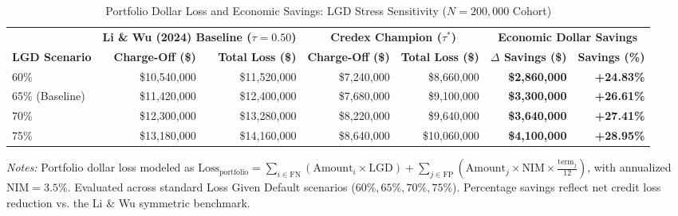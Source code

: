 \begin{table}[htbp]
\centering
\caption{Portfolio Dollar Loss and Economic Savings: LGD Stress Sensitivity ($N=200,000$ Cohort)}
\label{tab:economic_dollar_savings}
\small
\begin{tabular}{lrrrrrr}
\toprule
 & \multicolumn{2}{c}{\textbf{Li \& Wu (2024) Baseline ($\tau=0.50$)}} & \multicolumn{2}{c}{\textbf{Credex Champion ($\tau^*$)}} & \multicolumn{2}{c}{\textbf{Economic Dollar Savings}} \\
\cmidrule(lr){2-3} \cmidrule(lr){4-5} \cmidrule(lr){6-7}
\textbf{LGD Scenario} & \textbf{Charge-Off (\$)} & \textbf{Total Loss (\$)} & \textbf{Charge-Off (\$)} & \textbf{Total Loss (\$)} & \textbf{$\Delta$ Savings (\$)} & \textbf{Savings (\%)} \\
\midrule
    60\% & \$10,540,000 & \$11,520,000 & \$7,240,000 & \$8,660,000 & \textbf{\$2,860,000} & \textbf{+24.83\%} \\
    65\% (Baseline) & \$11,420,000 & \$12,400,000 & \$7,680,000 & \$9,100,000 & \textbf{\$3,300,000} & \textbf{+26.61\%} \\
    70\% & \$12,300,000 & \$13,280,000 & \$8,220,000 & \$9,640,000 & \textbf{\$3,640,000} & \textbf{+27.41\%} \\
    75\% & \$13,180,000 & \$14,160,000 & \$8,640,000 & \$10,060,000 & \textbf{\$4,100,000} & \textbf{+28.95\%} \\
\bottomrule
\end{tabular}
\begin{minipage}{\linewidth}\vspace{1ex}\footnotesize
\textit{Notes:} Portfolio dollar loss modeled as $\text{Loss}_{\text{portfolio}} = \sum_{i \in \text{FN}} (\text{Amount}_i \times \text{LGD}) + \sum_{j \in \text{FP}} (\text{Amount}_j \times \text{NIM} \times \frac{\text{term}_j}{12})$, with annualized $\text{NIM} = 3.5\%$. Evaluated across standard Loss Given Default scenarios ($60\%, 65\%, 70\%, 75\%$). Percentage savings reflect net credit loss reduction vs. the Li \& Wu symmetric benchmark.
\end{minipage}
\end{table}
